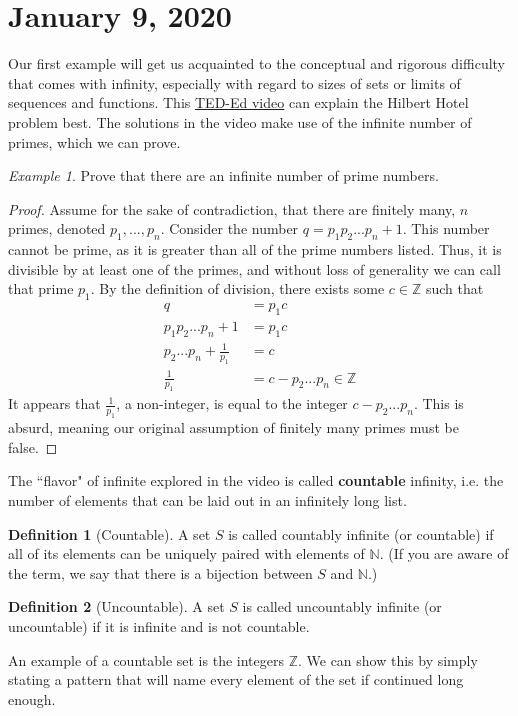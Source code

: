 \documentclass[11pt]{article}
\newcommand{\N}{\ensuremath{\mathbb N}}
\newcommand{\Z}{\ensuremath{\mathbb Z}}
\theoremstyle{plain}
\theoremstyle{definition}
\newtheorem{defi}{Definition}[section]
\theoremstyle{remark}
\newtheorem{exm}{Example}[section]
\begin{document}
\section{January 9, 2020}

Our first example will get us acquainted to the conceptual and rigorous difficulty that comes with infinity, especially with regard to sizes of sets or limits of sequences and functions. This \href{https://www.youtube.com/watch?v=Uj3_KqkI9Zo}{TED-Ed video} can explain the Hilbert Hotel problem best. The solutions in the video make use of the infinite number of primes, which we can prove.
\begin{exm}
    Prove that there are an infinite number of prime numbers.
\end{exm}
\begin{proof}
    Assume for the sake of contradiction, that there are finitely many, $n$ primes, denoted $p_1, ..., p_n$. Consider the number $q = p_1 p_2 ... p_n + 1$. This number cannot be prime, as it is greater than all of the prime numbers listed. Thus, it is divisible by at least one of the primes, and without loss of generality we can call that prime $p_1$. By the definition of division, there exists some $c \in \Z$ such that
    \begin{align*}
        q &= p_1 c\\
        p_1 p_2 ... p_n + 1 &= p_1 c\\
        p_2 ... p_n + \frac{1}{p_1} &= c\\
        \frac{1}{p_1} &= c - p_2 ... p_n \in \Z
    \end{align*}
    It appears that $\frac{1}{p_1}$, a non-integer, is equal to the integer $c - p_2 ... p_n$. This is absurd, meaning our original assumption of finitely many primes must be false.
\end{proof}
The ``flavor" of infinite explored in the video is called {\bf countable} infinity, i.e. the number of elements that can be laid out in an infinitely long list. 
\begin{defi}[Countable]
    A set $S$ is called countably infinite (or countable) if all of its elements can be uniquely paired with elements of $\N$. (If you are aware of the term, we say that there is a bijection between $S$ and $\N$.)
\end{defi}
\begin{defi}[Uncountable]
    A set $S$ is called uncountably infinite (or uncountable) if it is infinite and is not countable.
\end{defi}
An example of a countable set is the integers $\Z$. We can show this by simply stating a pattern that will name every element of the set if continued long enough.
\end{document}
